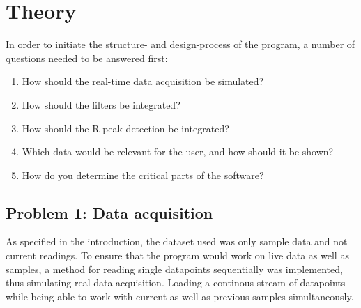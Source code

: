 \documentclass[12pt,a4paper]{article}
\begin{document}
\section{Theory}
 	In order to initiate the structure- and design-process of the program, a number of questions needed to be answered first:\\
 	
 	\begin{enumerate}
	\item How should the real-time data acquisition be simulated?
	\item How should the filters be integrated?
	\item How should the R-peak detection be integrated?
	\item Which data would be relevant for the user, and how should it be shown?
	\item How do you determine the critical parts of the software?
\end{enumerate}

\subsection{Problem 1: Data acquisition}
	As specified in the introduction, the dataset used was only sample data and not current readings. To ensure that the program would work on live data as well as samples, a method for reading single datapoints sequentially was implemented, thus simulating real data acquisition. Loading a continous stream of datapoints while being able to work with current as well as previous samples simultaneously.\\
	
\end{document}

